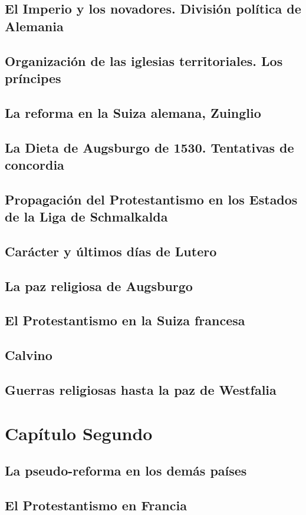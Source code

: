 \raggedbottom{} \documentclass[12pt, a4paper]{book}
\begin{document}
\section{El Imperio y los novadores. División política de Alemania}
\section{Organización de las iglesias territoriales. Los príncipes}
\section{La reforma en la Suiza alemana, Zuinglio}
\section{La Dieta de Augsburgo de 1530. Tentativas de concordia}
\section{Propagación del Protestantismo en los Estados de la Liga de Schmalkalda}
\section{Carácter y últimos días de Lutero}
\section{La paz religiosa de Augsburgo}
\section{El Protestantismo en la Suiza francesa}
\section{Calvino}
\section{Guerras religiosas hasta la paz de Westfalia}
\chapter{Capítulo Segundo}
\section{La pseudo-reforma en los demás países}
\section{El Protestantismo en Francia}
\end{document}
